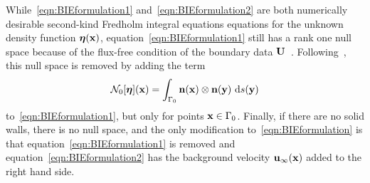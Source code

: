 \documentclass[preprint, 10pt]{elsarticle}
\begin{document}
While~\eqref{eqn:BIEformulation1} and~\eqref{eqn:BIEformulation2} are
both numerically desirable second-kind Fredholm integral equations
equations  for the unknown density function ${\boldsymbol\eta}({\mathbf{x}})$,
equation~\eqref{eqn:BIEformulation1} still has a rank one null space
because of the flux-free condition of the boundary data
${\mathbf{U}}$~\cite{Ladyzhenskaya1963}.  Following~\cite{Power1993}, this null
space is removed by adding the term 
\begin{align}
\label{eqn:N0_modification} 
  \mathcal{N}_0[{\boldsymbol\eta}]({\mathbf{x}}) = \int_{\Gamma_0} 
    {\mathbf{n}}({\mathbf{x}})\otimes{\mathbf{n}}({\mathbf{y}})~\text{d}s({\mathbf{y}})
\end{align}
to~\eqref{eqn:BIEformulation1}, but only for points ${\mathbf{x}} \in \Gamma_0$.
Finally, if there are no solid walls, there is no null space, and
the only modification to~\eqref{eqn:BIEformulation} is that
equation~\eqref{eqn:BIEformulation1} is removed and
equation~\eqref{eqn:BIEformulation2} has the background velocity
${\mathbf{u}}_\infty({\mathbf{x}})$ added to the right hand side.
\end{document}
